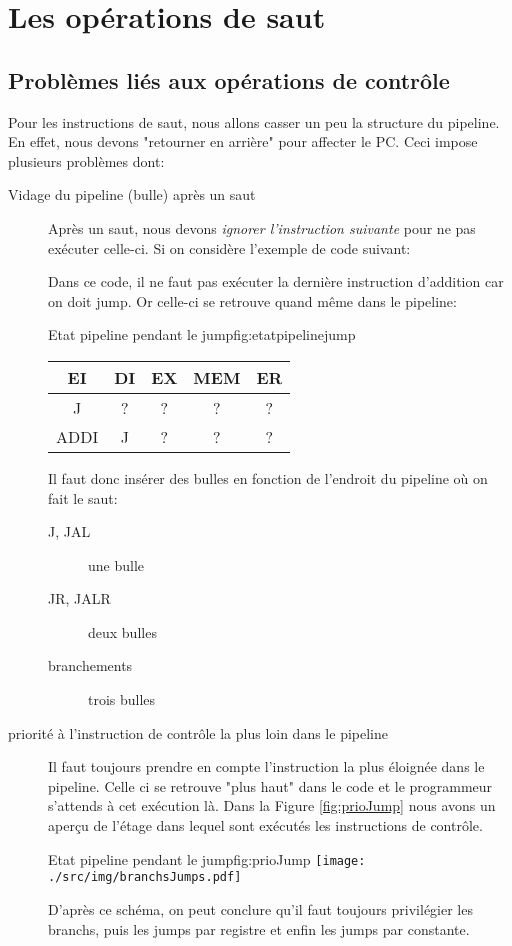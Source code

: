 \section{Les opérations de saut}
\subsection{Problèmes liés aux opérations de contrôle}\label{sec:bulles}
Pour les instructions de saut, nous allons casser un peu la structure du pipeline.
En effet, nous devons "retourner en arrière" pour affecter le PC. Ceci impose plusieurs problèmes dont:
\begin{description}
  \item[Vidage du pipeline (bulle) après un saut]
    Après un saut, nous devons \emph{ignorer l'instruction suivante} pour ne pas exécuter celle-ci. Si on considère l'exemple de code suivant:
    
    Dans ce code, il ne faut pas exécuter la dernière instruction d'addition car on doit jump.
    Or celle-ci se retrouve quand même dans le pipeline:
      \begin{figureGraphics}{Etat pipeline pendant le jump}{fig:etatpipelinejump}
        \centering
        \begin{tabular}{|c|c|c|c|c|}
          \hline
          EI  &   DI &  EX  &   MEM   &   ER \\
          \hline
          \hline
          J   &   ?  &  ?   &   ?     &  ?     \\
          \hline
          ADDI& J    &  ?   &   ?     & ?   \\
          \hline
        \end{tabular}
      \end{figureGraphics}
      Il faut donc insérer des bulles en fonction de l'endroit du pipeline où on fait le saut:
      \begin{description}
        \item[J, JAL] une bulle
        \item[JR, JALR] deux bulles
        \item[branchements] trois bulles
      \end{description}
  \item[priorité à l'instruction de contrôle la plus loin dans le pipeline]
      Il faut toujours prendre en compte l'instruction la plus éloignée dans le pipeline. Celle ci se retrouve "plus haut" dans le code et le 
    programmeur s'attends à cet exécution là. Dans la Figure \ref{fig:prioJump} nous avons un aperçu de l'étage dans lequel sont exécutés les instructions de contrôle.
      \begin{figureGraphics}{Etat pipeline pendant le jump}{fig:prioJump}
        \centering
        \texttt{[image: ./src/img/branchsJumps.pdf]}
      \end{figureGraphics}
      D'après ce schéma, on peut conclure qu'il faut toujours privilégier les branchs, puis les jumps par registre et enfin les jumps par constante.
\end{description}

